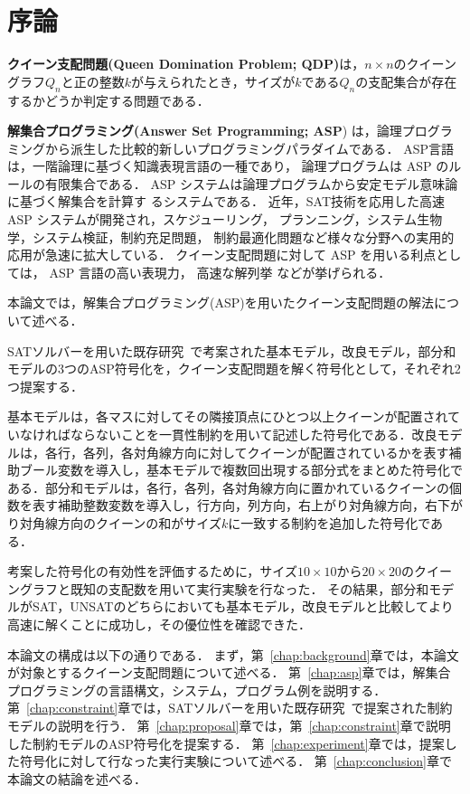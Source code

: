 \chapter{序論}\label{chap:introduction}

\textbf{クイーン支配問題(Queen Domination Problem; QDP)}は，$n \times n$のクイーングラフ$Q_{n}$と正の整数$k$が与えられたとき，サイズが$k$である$Q_{n}$の支配集合が存在するかどうか判定する問題である．

\textbf{解集合プログラミング(Answer Set Programming; ASP}\cite{%
  Baral03:cambridge,%
  Gelfond88:iclp,%
  Inoue08:jssst,%
  Niemela99:amai})
は，論理プログラミングから派生した比較的新しいプログラミングパラダイムである．
ASP言語は，一階論理に基づく知識表現言語の一種であり，
論理プログラムは ASP のルールの有限集合である．
ASP システムは論理プログラムから安定モデル意味論に基づく解集合を計算す
るシステムである．
近年，SAT技術を応用した高速 ASP システムが開発され，スケジューリング，
プランニング，システム生物学，システム検証，制約充足問題，
制約最適化問題など様々な分野への実用的応用が急速に拡大している．
クイーン支配問題に対して ASP を用いる利点としては，
ASP 言語の高い表現力，
高速な解列挙
などが挙げられる．

本論文では，解集合プログラミング(ASP)を用いたクイーン支配問題の解法について述べる．

SATソルバーを用いた既存研究~\cite{yamamoto21}で考案された基本モデル，改良モデル，部分和モデルの3つのASP符号化を，クイーン支配問題を解く符号化として，それぞれ2つ提案する．

基本モデルは，各マスに対してその隣接頂点にひとつ以上クイーンが配置されていなければならないことを一貫性制約を用いて記述した符号化である．改良モデルは，各行，各列，各対角線方向に対してクイーンが配置されているかを表す補助ブール変数を導入し，基本モデルで複数回出現する部分式をまとめた符号化である．部分和モデルは，各行，各列，各対角線方向に置かれているクイーンの個数を表す補助整数変数を導入し，行方向，列方向，右上がり対角線方向，右下がり対角線方向のクイーンの和がサイズ$k$に一致する制約を追加した符号化である．

考案した符号化の有効性を評価するために，サイズ$10 \times 10$から$20 \times 20$のクイーングラフと既知の支配数を用いて実行実験を行なった．
その結果，部分和モデルがSAT，UNSATのどちらにおいても基本モデル，改良モデルと比較してより高速に解くことに成功し，その優位性を確認できた．

本論文の構成は以下の通りである．
まず，第~\ref{chap:background}章では，本論文が対象とするクイーン支配問題について述べる．
第~\ref{chap:asp}章では，解集合プログラミングの言語構文，システム，プログラム例を説明する．
第~\ref{chap:constraint}章では，SATソルバーを用いた既存研究~\cite{yamamoto21}で提案された制約モデルの説明を行う．
第~\ref{chap:proposal}章では，第~\ref{chap:constraint}章で説明した制約モデルのASP符号化を提案する．
第~\ref{chap:experiment}章では，提案した符号化に対して行なった実行実験について述べる．
第~\ref{chap:conclusion}章で本論文の結論を述べる．

